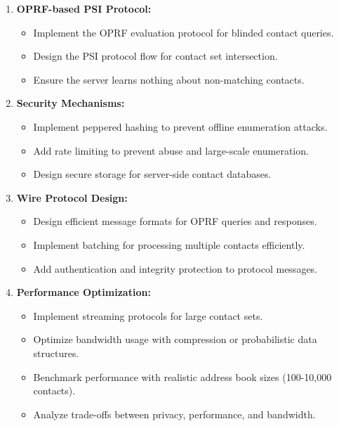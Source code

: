 \documentclass[10pt,a4paper,american]{exam}
\begin{document}
\begin{enumerate}
	\item \textbf{OPRF-based PSI Protocol:}
	      \begin{itemize}
		      \item Implement the OPRF evaluation protocol for blinded contact queries.
		      \item Design the PSI protocol flow for contact set intersection.
		      \item Ensure the server learns nothing about non-matching contacts.
	      \end{itemize}

	\item \textbf{Security Mechanisms:}
	      \begin{itemize}
		      \item Implement peppered hashing to prevent offline enumeration attacks.
		      \item Add rate limiting to prevent abuse and large-scale enumeration.
		      \item Design secure storage for server-side contact databases.
	      \end{itemize}

	\item \textbf{Wire Protocol Design:}
	      \begin{itemize}
		      \item Design efficient message formats for OPRF queries and responses.
		      \item Implement batching for processing multiple contacts efficiently.
		      \item Add authentication and integrity protection to protocol messages.
	      \end{itemize}

	\item \textbf{Performance Optimization:}
	      \begin{itemize}
		      \item Implement streaming protocols for large contact sets.
		      \item Optimize bandwidth usage with compression or probabilistic data structures.
		      \item Benchmark performance with realistic address book sizes (100-10,000 contacts).
		      \item Analyze trade-offs between privacy, performance, and bandwidth.
	      \end{itemize}
\end{enumerate}
\end{document}
